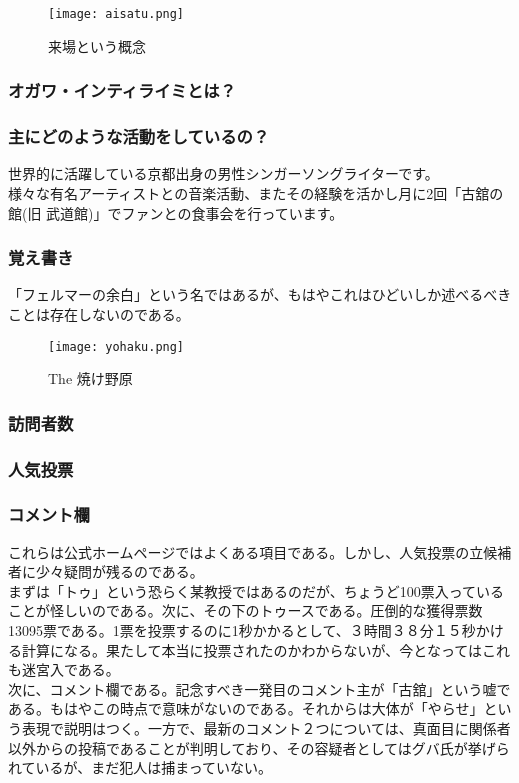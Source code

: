 \begin{figure}[H]
  \centering
  \texttt{[image: aisatu.png]}
  \caption{来場という概念}
\label{aisatu}
\end{figure}

\subsubsection{オガワ・インティライミとは？}
\subsubsection{主にどのような活動をしているの？}
世界的に活躍している京都出身の男性シンガーソングライターです。 \\
様々な有名アーティストとの音楽活動、またその経験を活かし月に2回「古舘の館(旧 武道館)」でファンとの食事会を行っています。\\

\subsubsection{覚え書き}
「フェルマーの余白」という名ではあるが、もはやこれはひどいしか述べるべきことは存在しないのである。

\begin{figure}[H]
  \centering
  \texttt{[image: yohaku.png]}
  \caption{The 焼け野原}
\label{yohaku}
\end{figure}


\subsubsection{訪問者数}
\subsubsection{人気投票}
\subsubsection{コメント欄}
これらは公式ホームページではよくある項目である。しかし、人気投票の立候補者に少々疑問が残るのである。\\
まずは「トゥ」という恐らく某教授ではあるのだが、ちょうど100票入っていることが怪しいのである。次に、その下のトゥースである。圧倒的な獲得票数13095票である。1票を投票するのに1秒かかるとして、３時間３８分１５秒かける計算になる。果たして本当に投票されたのかわからないが、今となってはこれも迷宮入である。\\
次に、コメント欄である。記念すべき一発目のコメント主が「古舘」という嘘である。もはやこの時点で意味がないのである。それからは大体が「やらせ」という表現で説明はつく。一方で、最新のコメント２つについては、真面目に関係者以外からの投稿であることが判明しており、その容疑者としてはグバ氏が挙げられているが、まだ犯人は捕まっていない。

